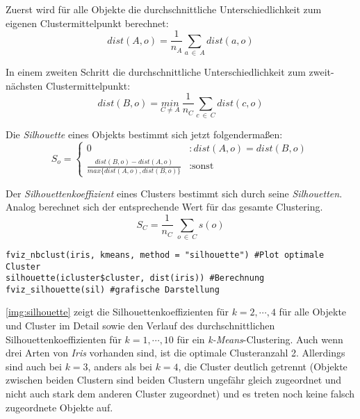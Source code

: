 \documentclass[a4paper,12pt,twoside]{article}
\newcommand{\Fachbegriff}[1]{\textit{#1}}
\begin{document}
Zuerst wird für alle Objekte die durchschnittliche Unterschiedlichkeit zum eigenen Clustermittelpunkt berechnet:
\begin{equation}
dist(A,o) = \frac{1}{n_A} \sum_{a~\in~A} dist(a,o)
\end{equation}

In einem zweiten Schritt die durchschnittliche Unterschiedlichkeit zum zweit-nächsten Clustermittelpunkt: 
\begin{equation}
dist(B,o) = \underset{C\neq A}{min} ~ \frac{1}{n_C} \sum_{c~\in~C} dist(c,o)
\end{equation}

Die \Fachbegriff{Silhouette} eines Objekts bestimmt sich jetzt folgendermaßen:
\begin{equation}
S_{o} = \left\{
\begin{array}{lr}
0 & : dist(A,o) = dist(B,o)\\
\frac{dist(B,o) - dist(A,o)}{max\lbrace dist(A,o),dist(B,o)\rbrace} & :\text{sonst}
\end{array}
\right.
\end{equation}

Der \Fachbegriff{Silhouettenkoeffizient} eines Clusters bestimmt sich durch seine \Fachbegriff{Silhouetten}. Analog berechnet sich der entsprechende Wert für das gesamte Clustering.
\begin{equation}
S_{C} = \frac{1}{n_{C}} ~ \sum_{o~\in~C} s(o)
\end{equation}

\begin{lstlisting}[caption={\Fachbegriff{Silhouettekoeffizient} in \Fachbegriff{R}}, label=list:silhouette]
fviz_nbclust(iris, kmeans, method = "silhouette") #Plot optimale Cluster
silhouette(icluster$cluster, dist(iris)) #Berechnung
fviz_silhouette(sil) #grafische Darstellung
\end{lstlisting}

\autoref{img:silhouette} zeigt die Silhouettenkoeffizienten für $k=2, \cdots, 4$ für alle Objekte und Cluster im Detail sowie den Verlauf des durchschnittlichen Silhouettenkoeffizienten für $k=1,\cdots,10$ für ein \Fachbegriff{k-Means}-Clustering. Auch wenn drei Arten von \Fachbegriff{Iris} vorhanden sind, ist die optimale Clusteranzahl 2. Allerdings sind auch bei $k=3$, anders als bei $k=4$, die Cluster deutlich getrennt (Objekte zwischen beiden Clustern sind beiden Clustern ungefähr gleich zugeordnet und nicht auch stark dem anderen Cluster zugeordnet) und es treten noch keine falsch zugeordnete Objekte auf.
  
\end{document}
